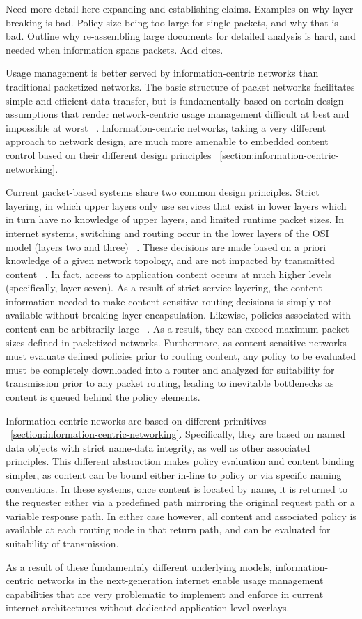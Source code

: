 \label{section:capabilities}
\color{red}
Need more detail here expanding and establishing claims.  Examples on why layer breaking is bad.  Policy size being too large for single packets, and why that is bad.  Outline why re-assembling large documents for detailed analysis is hard, and needed when information spans packets.  Add cites.
\color{black}

Usage management is better served by information-centric networks than traditional packetized networks.  The basic structure of packet networks facilitates simple and efficient data transfer, but is fundamentally based on certain design assumptions that render network-centric usage management difficult at best and impossible at worst ~\cite{Cl:88,SaReCl:84}.  Information-centric networks, taking a very different approach to network design, are much more amenable to embedded content control based on their different design principles ~\ref{section:information-centric-networking}.

Current packet-based systems share two common design principles.  Strict layering, in which upper layers only use services that exist in lower layers which in turn have no knowledge of upper layers, and limited runtime packet sizes.  In internet systems, switching and routing occur in the lower layers of the OSI model (layers two and three) ~\cite{TODO}.  These decisions are made based on a priori knowledge of a given network topology, and are not impacted by transmitted content ~\cite{TODO}.  In fact, access to application content occurs at much higher levels (specifically, layer seven).  As a result of strict service layering, the content information needed to make content-sensitive routing decisions is simply not available without breaking layer encapsulation.  Likewise, policies associated with content can be arbitrarily large ~\cite{TODO}.  As a result, they can exceed maximum packet sizes defined in packetized networks.  Furthermore, as content-sensitive networks must evaluate defined policies prior to routing content, any policy to be evaluated must be completely downloaded into a router and analyzed for suitability for transmission prior to any packet routing, leading to inevitable bottlenecks as content is queued behind the policy elements.

Information-centric neworks are based on different primitives ~\ref{section:information-centric-networking}.  Specifically, they are based on named data objects with strict name-data integrity, as well as other associated principles.  This different abstraction makes policy evaluation and content binding simpler, as content can be bound either in-line to policy or via specific naming conventions.  In these systems, once content is located by name, it is returned to the requester either via a predefined path mirroring the original request path or a variable response path.  In either case however, all content and associated policy is available at each routing node in that return path, and can be evaluated for suitability of transmission.

As a result of these fundamentaly different underlying models, information-centric networks in the next-generation internet enable usage management capabilities that are very problematic to implement and enforce in current internet architectures without dedicated application-level overlays.